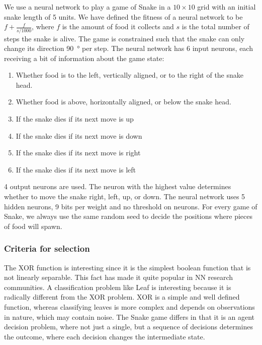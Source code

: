 We use a neural network to play a game of Snake in a $10\times10$ grid with an initial snake length of 5 units.
We have defined the fitness of a neural network to be $f + \frac{f}{s/1000}$,
where $f$ is the amount of food it collects and $s$ is the total number of steps the snake is alive. The game is constrained such that the snake can only change its direction \SI{90}{\degree} per step. The neural network has 6 input neurons, each receiving a bit of information about the game state:
\begin{enumerate}
  \item {} Whether food is to the left, vertically aligned, or to the right of the snake head.
  \item {} Whether food is above, horizontally aligned, or below the snake head.
  \item {} If the snake dies if its next move is up
  \item {} If the snake dies if its next move is down
  \item {} If the snake dies if its next move is right 
  \item {} If the snake dies if its next move is left
\end{enumerate}
4 output neurons are used. The neuron with the highest value determines whether to move the snake right, left, up, or down.
The neural network uses 5 hidden neurons, 9 bits per weight and no threshold on neurons.
For every game of Snake, we always use the same random seed to decide the positions where pieces of food will spawn.

\subsubsection{Criteria for selection}
The XOR function is interesting since it is the simplest boolean function that is not linearly separable.
This fact has made it quite popular in NN research communities\cite{masterThesisGANN}.
A classification problem like Leaf is interesting because it is radically different from the XOR problem.
XOR is a simple and well defined function, whereas classifying leaves is more complex and depends on observations in nature, which may contain noise.
The Snake game differs in that it is an agent decision problem, where not just a single, but a sequence of decisions determines the outcome, where each decision changes the intermediate state.
